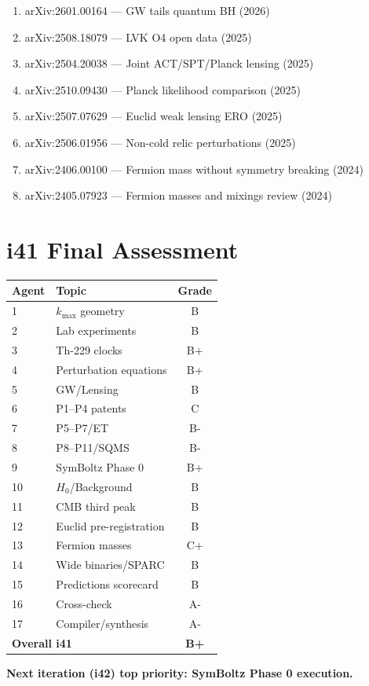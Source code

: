 \documentclass[11pt,a4paper]{article}
\begin{document}
\begin{enumerate}
\item arXiv:2601.00164 --- GW tails quantum BH (2026)
\item arXiv:2508.18079 --- LVK O4 open data (2025)
\item arXiv:2504.20038 --- Joint ACT/SPT/Planck lensing (2025)
\item arXiv:2510.09430 --- Planck likelihood comparison (2025)
\item arXiv:2507.07629 --- Euclid weak lensing ERO (2025)
\item arXiv:2506.01956 --- Non-cold relic perturbations (2025)
\item arXiv:2406.00100 --- Fermion mass without symmetry breaking (2024)
\item arXiv:2405.07923 --- Fermion masses and mixings review (2024)
\end{enumerate}


\section*{i41 Final Assessment}

\begin{center}
\begin{tabular}{llc}
\toprule
\textbf{Agent} & \textbf{Topic} & \textbf{Grade} \\
\midrule
1 & $k_{\max}$ geometry & B \\
2 & Lab experiments & B \\
3 & Th-229 clocks & B+ \\
4 & Perturbation equations & B+ \\
5 & GW/Lensing & B \\
6 & P1--P4 patents & C \\
7 & P5--P7/ET & B- \\
8 & P8--P11/SQMS & B- \\
9 & SymBoltz Phase 0 & B+ \\
10 & $H_0$/Background & B \\
11 & CMB third peak & B \\
12 & Euclid pre-registration & B \\
13 & Fermion masses & C+ \\
14 & Wide binaries/SPARC & B \\
15 & Predictions scorecard & B \\
16 & Cross-check & A- \\
17 & Compiler/synthesis & A- \\
\midrule
\multicolumn{2}{l}{\textbf{Overall i41}} & \textbf{B+} \\
\bottomrule
\end{tabular}
\end{center}

\textbf{Next iteration (i42) top priority: SymBoltz Phase 0 execution.}
\end{document}
